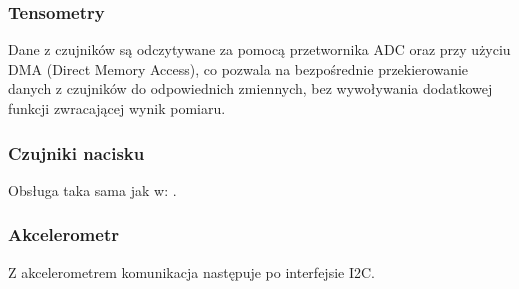 \documentclass[12pt,a4paper]{article}
\begin{document}
\subsubsection{Tensometry} \label{tensometry}
Dane z czujników są odczytywane za pomocą przetwornika ADC oraz przy użyciu DMA (Direct Memory Access), co pozwala na bezpośrednie przekierowanie danych z czujników do odpowiednich zmiennych, bez wywoływania dodatkowej funkcji zwracającej wynik pomiaru.
\subsubsection{Czujniki nacisku}
Obsługa taka sama jak w: .
\subsubsection{Akcelerometr}
Z akcelerometrem komunikacja następuje po interfejsie I2C.
\end{document}
